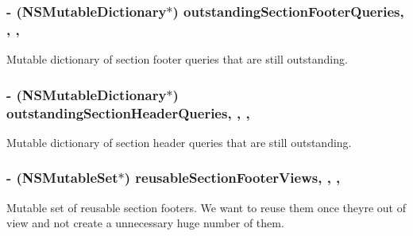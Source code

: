 \subsubsection[{outstanding\+Section\+Footer\+Queries}]{\setlength{\rightskip}{0pt plus 5cm}-\/ (N\+S\+Mutable\+Dictionary$\ast$) outstanding\+Section\+Footer\+Queries\hspace{0.3cm}{\ttfamily [read]}, {\ttfamily [write]}, {\ttfamily [nonatomic]}, {\ttfamily [strong]}}\label{interface_e_s_popular_view_controller_a0e66ab4dae466e904f3fa4140faa23dc}
Mutable dictionary of section footer queries that are still outstanding. \hypertarget{interface_e_s_popular_view_controller_a594b3d651a41e433f2770b161e8f201b}{}
\subsubsection[{outstanding\+Section\+Header\+Queries}]{\setlength{\rightskip}{0pt plus 5cm}-\/ (N\+S\+Mutable\+Dictionary$\ast$) outstanding\+Section\+Header\+Queries\hspace{0.3cm}{\ttfamily [read]}, {\ttfamily [write]}, {\ttfamily [nonatomic]}, {\ttfamily [strong]}}\label{interface_e_s_popular_view_controller_a594b3d651a41e433f2770b161e8f201b}
Mutable dictionary of section header queries that are still outstanding. \hypertarget{interface_e_s_popular_view_controller_a953314997f08a2a573390a975dddf13a}{}
\subsubsection[{reusable\+Section\+Footer\+Views}]{\setlength{\rightskip}{0pt plus 5cm}-\/ (N\+S\+Mutable\+Set$\ast$) reusable\+Section\+Footer\+Views\hspace{0.3cm}{\ttfamily [read]}, {\ttfamily [write]}, {\ttfamily [nonatomic]}, {\ttfamily [strong]}}\label{interface_e_s_popular_view_controller_a953314997f08a2a573390a975dddf13a}
Mutable set of reusable section footers. We want to reuse them once they\textquotesingle{}re out of view and not create a unnecessary huge number of them. \hypertarget{interface_e_s_popular_view_controller_ababc6cca18647ce1312ee3ad29d13475}{}
